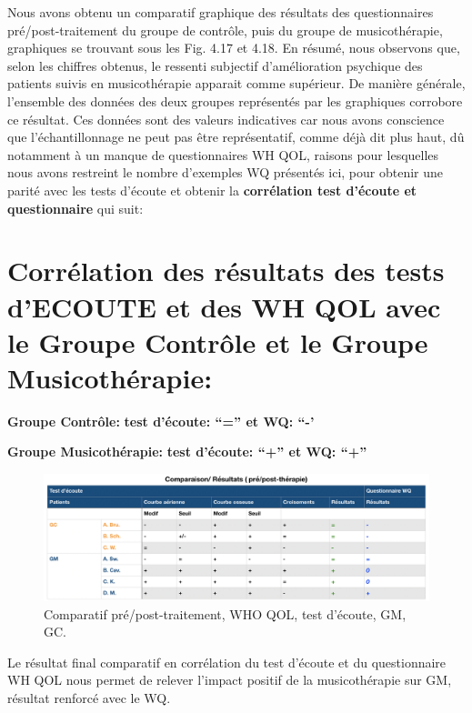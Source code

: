 Nous avons obtenu un comparatif graphique  des résultats des questionnaires
pré/post-traitement du groupe de contrôle, puis du groupe de musicothérapie,
graphiques se trouvant sous les Fig. 4.17 et 4.18.
       En résumé, nous observons que, selon les chiffres obtenus, le ressenti
       subjectif d'amélioration psychique
        des patients suivis en musicothérapie apparait comme
        supérieur.
        De manière générale, l'ensemble des données des deux groupes représentés
        par les graphiques corrobore ce résultat.
        Ces données sont des valeurs indicatives car nous avons conscience que l'échantillonnage ne
        peut pas être représentatif, comme déjà dit plus haut, dû
        notamment à un
        manque de
        questionnaires WH QOL, raisons pour lesquelles nous avons
        restreint le nombre d'exemples WQ présentés ici, pour obtenir
        une parité avec les tests d'écoute et obtenir la
        \textbf{corrélation test d'écoute et questionnaire} qui
        suit:

  \section{Corrélation des résultats des tests d'ECOUTE et des WH QOL avec le Groupe Contrôle et le
    Groupe Musicothérapie:}
\textbf{Groupe Contrôle:} 	          \textbf{ test d'écoute: ``=''   et    WQ: ``-'}


\textbf{Groupe Musicothérapie:}     \textbf{test d'écoute: ``+''      et    WQ: ``+''}


 \begin{figure}[th]
\centering
\includegraphics[width=1\linewidth]{images/graphiques/comparaison_pre_post.png}
\caption[Corrélation résultats pré/post]{Comparatif
  pré/post-traitement, WHO QOL, test d'écoute, GM, GC.}

\label{comparaison_pre_post}
\end{figure}


Le résultat final comparatif en corrélation du test d'écoute et du questionnaire WH QOL nous permet
                de relever l'impact positif de la
                musicothérapie sur GM, résultat renforcé
                avec le WQ.


